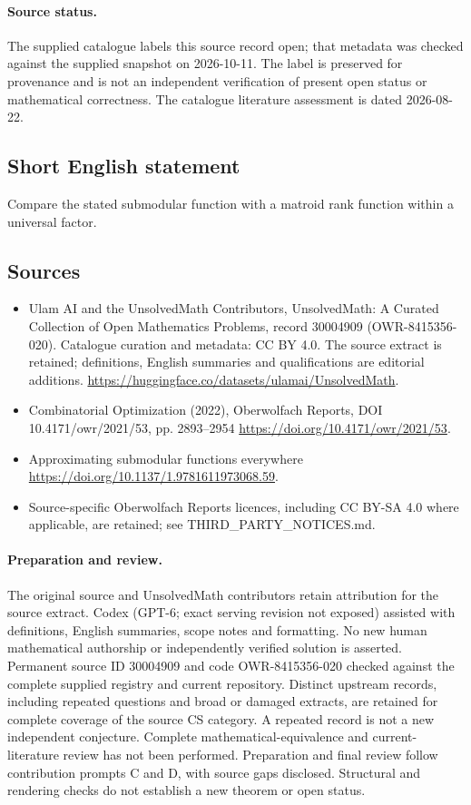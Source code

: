 \documentclass[11pt]{article}
\begin{document}
\paragraph{Source status.}
The supplied catalogue labels this source record open; that metadata was checked against the supplied snapshot on 2026-10-11. The label is preserved for provenance and is not an independent verification of present open status or mathematical correctness. The catalogue literature assessment is dated 2026-08-22.
\subsection{Short English statement}
Compare the stated submodular function with a matroid rank function within a universal factor.
\subsection{Sources}
\begin{itemize}
\item[\hypertarget{source:30004909:1}{S1}] Ulam AI and the UnsolvedMath Contributors, UnsolvedMath: A Curated Collection of Open Mathematics Problems, record 30004909 (OWR-8415356-020). Catalogue curation and metadata: CC BY 4.0. The source extract is retained; definitions, English summaries and qualifications are editorial additions.
\url{https://huggingface.co/datasets/ulamai/UnsolvedMath}.
\item[\hypertarget{source:30004909:2}{S2}] Combinatorial Optimization (2022), Oberwolfach Reports, DOI 10.4171/owr/2021/53, pp. 2893--2954
\url{https://doi.org/10.4171/owr/2021/53}.
\item[\hypertarget{source:30004909:3}{S3}] Approximating submodular functions everywhere
\url{https://doi.org/10.1137/1.9781611973068.59}.
\item Source-specific Oberwolfach Reports licences, including CC BY-SA 4.0 where applicable, are retained; see THIRD\_PARTY\_NOTICES.md.
\end{itemize}
\paragraph{Preparation and review.}
The original source and UnsolvedMath contributors retain attribution for the source extract. Codex (GPT-6; exact serving revision not exposed) assisted with definitions, English summaries, scope notes and formatting. No new human mathematical authorship or independently verified solution is asserted. Permanent source ID 30004909 and code OWR-8415356-020 checked against the complete supplied registry and current repository. Distinct upstream records, including repeated questions and broad or damaged extracts, are retained for complete coverage of the source CS category. A repeated record is not a new independent conjecture. Complete mathematical-equivalence and current-literature review has not been performed. Preparation and final review follow contribution prompts C and D, with source gaps disclosed. Structural and rendering checks do not establish a new theorem or open status.
\label{end:30004909}
\end{document}
